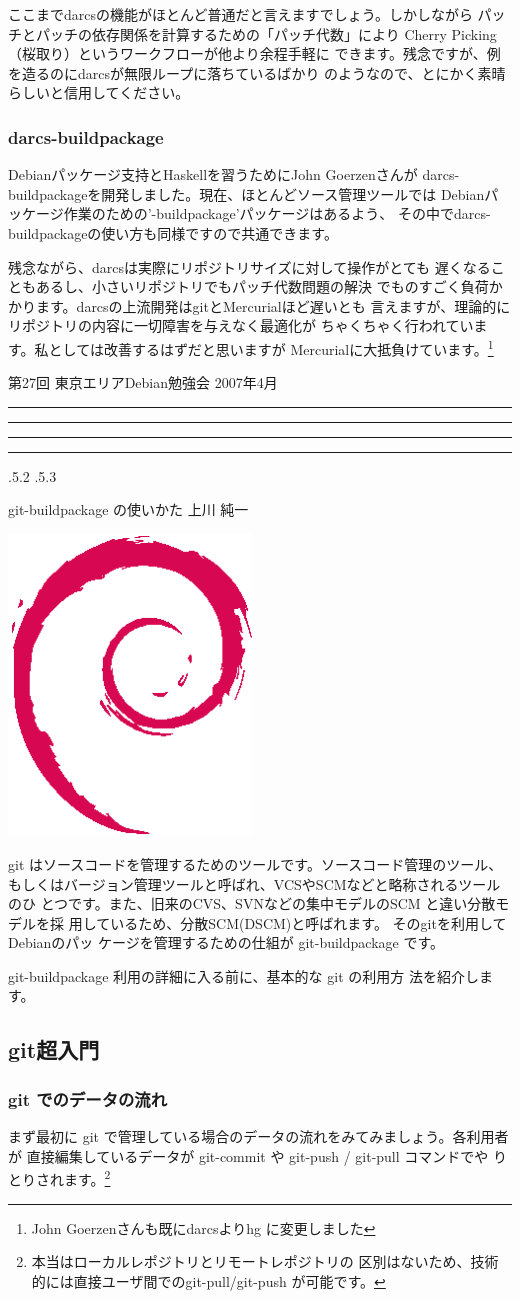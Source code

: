 \documentclass[mingoth,a4paper]{jsarticle}
\makeatletter
\newcommand{\debmtgyear}{2007}
\newcommand{\debmtgmonth}{4}
\newcommand{\debmtgnumber}{27}
\renewcommand{\section}{\@startsection{section}{1}{\z@}%
    {\Cvs \@plus.5\Cdp \@minus.2\Cdp}%
    {.5\Cvs \@plus.3\Cdp}%
    {\normalfont\gt\fontsize{32}{32}\headfont\raggedright}} %
\newcommand{\dancersection}[2]{%
\newpage
第\debmtgnumber{}回 東京エリアDebian勉強会 \debmtgyear{}年\debmtgmonth{}月
\hrule
\vspace{0.5mm}
\hrule
%
\vspace{4cm}
\hrule
\vspace{0.5mm}
\hrule
%
\vspace{-7cm}
\begin{minipage}[b]{0.7\hsize}
\section{#1}
\hfill{}#2\\
\vspace{2cm}
\end{minipage}
\begin{minipage}[b]{0.3\hsize}
\hfill{}\includegraphics[height=8cm]{image200502/openlogo-nd.eps}\\
\end{minipage}
%
\vspace{-1cm}
}
\makeatother
\begin{document}
ここまでdarcsの機能がほとんど普通だと言えますでしょう。しかしながら
パッチとパッチの依存関係を計算するための「パッチ代数」により
Cherry Picking（桜取り）というワークフローが他より余程手軽に
できます。残念ですが、例を造るのにdarcsが無限ループに落ちているばかり
のようなので、とにかく素晴らしいと信用してください。

\subsubsection{darcs-buildpackage}

Debianパッケージ支持とHaskellを習うためにJohn Goerzenさんが
darcs-buildpackageを開発しました。現在、ほとんどソース管理ツールでは
Debianパッケージ作業のための'-buildpackage'パッケージはあるよう、
その中でdarcs-buildpackageの使い方も同様ですので共通できます。

残念ながら、darcsは実際にリポジトリサイズに対して操作がとても
遅くなることもあるし、小さいリポジトリでもパッチ代数問題の解決
でものすごく負荷かかります。darcsの上流開発はgitとMercurialほど遅いとも
言えますが、理論的にリポジトリの内容に一切障害を与えなく最適化が
ちゃくちゃく行われています。私としては改善するはずだと思いますが
Mercurialに大抵負けています。\footnote{John Goerzenさんも既にdarcsよりhg
に変更しました}

\dancersection{git-buildpackage の使いかた}{上川 純一}
\label{sec:git}

git はソースコードを管理するためのツールです。ソースコード管理のツール、
もしくはバージョン管理ツールと呼ばれ、VCSやSCMなどと略称されるツールのひ
とつです。また、旧来のCVS、SVNなどの集中モデルのSCM と違い分散モデルを採
用しているため、分散SCM(DSCM)と呼ばれます。 そのgitを利用してDebianのパッ
ケージを管理するための仕組が git-buildpackage です。

git-buildpackage 利用の詳細に入る前に、基本的な git の利用方
法を紹介します。

\subsection{git超入門}

\subsubsection{git でのデータの流れ}

まず最初に git で管理している場合のデータの流れをみてみましょう。各利用者が
直接編集しているデータが git-commit や git-push / git-pull コマンドでや
りとりされます。\footnote{本当はローカルレポジトリとリモートレポジトリの
区別はないため、技術的には直接ユーザ間でのgit-pull/git-push が可能です。}
\end{document}
